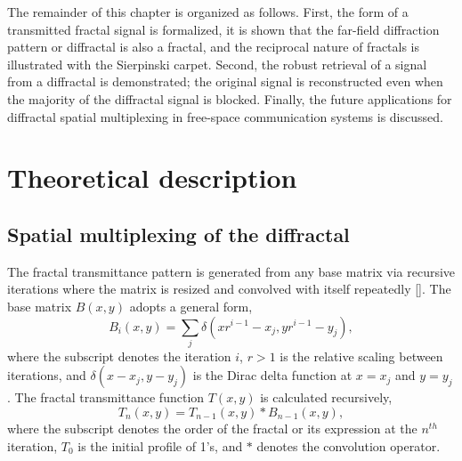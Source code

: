 The remainder of this chapter is organized as follows.  First, the form of a transmitted fractal signal is formalized, it is shown that the far-field diffraction pattern or diffractal is also a fractal, and the reciprocal nature of fractals is illustrated with the Sierpinski carpet. Second, the robust retrieval of a signal from a diffractal is demonstrated; the original signal is reconstructed even when the majority of the diffractal signal is blocked. Finally, the future applications for diffractal spatial multiplexing in free-space communication systems is discussed. 

\section{Theoretical description}\label{theory} 
\subsection{Spatial multiplexing of the diffractal} 

The fractal transmittance pattern is generated from any base matrix via recursive iterations where the matrix is resized and convolved with itself repeatedly [\cite{Allouche}].  The base matrix $B(x,y)$ adopts a general form,
\begin{equation}
B_i(x,y) = \sum_j\delta(xr^{i-1}-x_j,yr^{i-1}-y_j),
\label{BJ1}
\end{equation}
where the subscript denotes the iteration $i$, $r>1$ is the relative scaling between iterations, and $\delta(x-x_j,y-y_j)$ is the Dirac delta function at $x = x_j$ and $y=y_j$. 
The fractal transmittance function $T(x,y)$ is calculated recursively,
\begin{equation}
T_n(x,y) = T_{n-1}(x,y)*B_{n-1}(x,y),
\label{nTrans}
\end{equation}
where the subscript denotes the order of the fractal or its expression at the $n^{th}$ iteration, $T_0$ is the initial profile of 1's, and $*$ denotes the convolution operator.  

